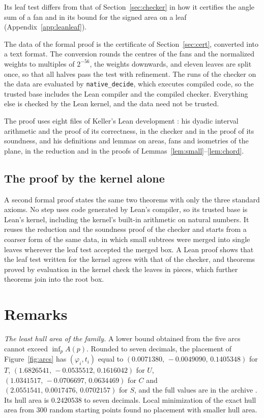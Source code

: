 \documentclass[11pt]{amsart}
\theoremstyle{definition}
\theoremstyle{remark}
\numberwithin{equation}{section}
\newcommand{\FAMMIN}{0.2420538}            %
\newcommand{\LEANCERT}{of Section~\ref{sec:cert}}
\begin{document}
Its leaf test differs from that of Section~\ref{sec:checker} in how it certifies the angle sum of a fan and in its bound for the signed area on a leaf (Appendix~\ref{app:leanleaf}).

The data of the formal proof is the certificate \LEANCERT, converted into a text format. The conversion rounds the centres of the fans and the normalized weights to multiples of $2^{-56}$, the weights downwards, and eleven leaves are split once, so that all halves pass the test with refinement. The runs of the checker on the data are evaluated by \texttt{native\_decide}, which executes compiled code, so the trusted base includes the Lean compiler and the compiled checker. Everything else is checked by the Lean kernel, and the data need not be trusted.

The proof uses eight files of Keller's Lean development \cite{KelLean}: his dyadic interval arithmetic and the proof of its correctness, in the checker and in the proof of its soundness, and his definitions and lemmas on areas, fans and isometries of the plane, in the reduction and in the proofs of Lemmas~\ref{lem:small}--\ref{lem:chord}.

\subsection*{The proof by the kernel alone}
A second formal proof states the same two theorems with only the three standard axioms. No step uses code generated by Lean's compiler, so its trusted base is Lean's kernel, including the kernel's built-in arithmetic on natural numbers. It reuses the reduction and the soundness proof of the checker and starts from a coarser form of the same data, in which small subtrees were merged into single leaves wherever the leaf test accepted the merged box. A Lean proof shows that the leaf test written for the kernel agrees with that of the checker, and theorems proved by evaluation in the kernel check the leaves in pieces, which further theorems join into the root box.

\section{Remarks}\label{sec:limits}

\emph{The least hull area of the family.} A lower bound obtained from the five arcs cannot exceed $\inf_pA(p)$. Rounded to seven decimals, the placement of Figure~\ref{fig:arcs} has $(\varphi_i,t_i)$ equal to $(0.0071380,\,-0.0049090,\,0.1405348)$ for $T$, $(1.6826541,\,-0.0535512,\,0.1616042)$ for $U$, $(1.0341517,\,-0.0706697,\,0.0634469)$ for $C$ and $(2.0551541,\,0.0017476,\,0.0702157)$ for $S$, and the full values are in the archive \cite{TomData}. Its hull area is $\FAMMIN$ to seven decimals. Local minimization of the exact hull area from $300$ random starting points found no placement with smaller hull area.
\end{document}
